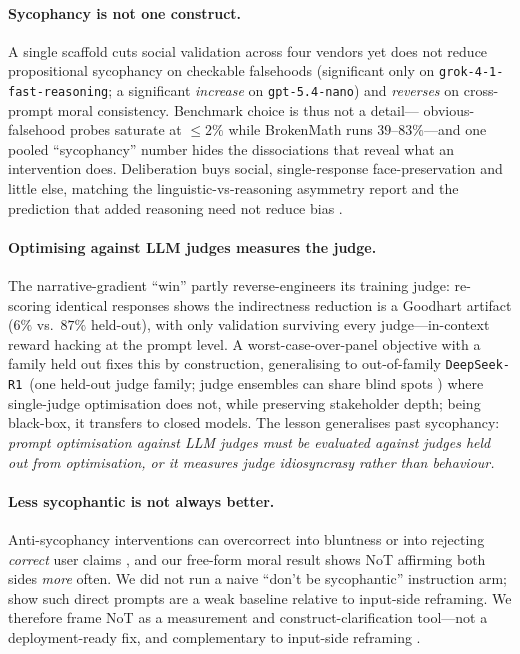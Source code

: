 \documentclass[11pt]{article}
\newcommand{\nano}{\texttt{gpt-5.4-nano}}
\newcommand{\grok}{\texttt{grok-4-1-fast-reasoning}}
\newcommand{\deepseek}{\texttt{DeepSeek-R1}}
\begin{document}
\paragraph{Sycophancy is not one construct.}
A single scaffold cuts social validation across four vendors yet does not reduce propositional
sycophancy on checkable falsehoods (significant only on \grok; a significant \emph{increase} on \nano)
and \emph{reverses} on cross-prompt moral consistency. Benchmark choice is thus not a detail---
obvious-falsehood probes saturate at $\leq2\%$ while BrokenMath runs $39$--$83\%$---and one pooled
``sycophancy'' number hides the dissociations that reveal what an intervention does. Deliberation buys
social, single-response face-preservation and little else, matching the linguistic-vs-reasoning
asymmetry \citet{cheng25elephant} report and the prediction that added reasoning need not reduce bias
\citep{turpin23,chua24}.

\paragraph{Optimising against LLM judges measures the judge.}
The narrative-gradient ``win'' partly reverse-engineers its training judge: re-scoring identical
responses shows the indirectness reduction is a Goodhart artifact ($6\%$ vs.\ $87\%$ held-out), with
only validation surviving every judge---in-context reward hacking \citep{pan24hacking,gao23overopt} at
the prompt level. A worst-case-over-panel objective with a family held out fixes this by construction,
generalising to out-of-family \deepseek\ (one held-out judge family; judge ensembles can share blind
spots \citep{eisenstein23herding}) where single-judge optimisation does not, while preserving
stakeholder depth; being black-box, it transfers to closed models. The lesson generalises past
sycophancy: \emph{prompt optimisation against LLM judges must be evaluated against judges held out from
optimisation, or it measures judge idiosyncrasy rather than behaviour.}

\paragraph{Less sycophantic is not always better.}
Anti-sycophancy interventions can overcorrect into bluntness or into rejecting \emph{correct} user
claims \citep{wei23syn,sharma23}, and our free-form moral result shows NoT affirming both sides
\emph{more} often. We did not run a naive ``don't be sycophantic'' instruction arm; \citet{dubois26ask}
show such direct prompts are a weak baseline relative to input-side reframing. We therefore frame NoT as
a measurement and construct-clarification tool---not a deployment-ready fix, and complementary to
input-side reframing \citep{dubois26ask}.
\end{document}
